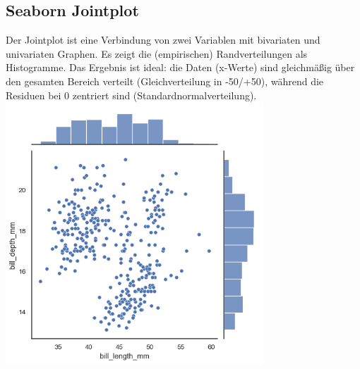 \subsection{Seaborn Jointplot}
Der Jointplot ist eine Verbindung von zwei Variablen mit bivariaten und univariaten Graphen. Es zeigt die (empirischen) Randverteilungen als Histogramme. Das Ergebnis ist ideal: die Daten (x-Werte) sind gleichmäßig über den gesamten Bereich verteilt (Gleichverteilung in -50/+50), während die Residuen bei 0 zentriert sind (Standardnormalverteilung).
\includegraphics[width=0.9\linewidth]{img/seaborn_jointplot.png}